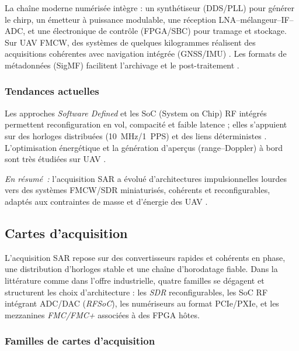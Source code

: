 La chaîne moderne numérisée intègre : un synthétiseur (DDS/PLL) pour générer le chirp, un émetteur à puissance modulable, une réception LNA--mélangeur--IF--ADC, et une électronique de contrôle (FPGA/SBC) pour tramage et stockage. Sur UAV FMCW, des systèmes de quelques kilogrammes réalisent des acquisitions cohérentes avec navigation intégrée (GNSS/IMU) \cite{Aguasca2013_ARBRES_UAV_SAR,Svedin2021_UAVSAR}. Les formats de métadonnées (SigMF) facilitent l’archivage et le post-traitement \cite{Balister2017_SigMF}.

\subsubsection{Tendances actuelles}

Les approches \textit{Software Defined} et les SoC (System on Chip) RF intégrés permettent reconfiguration en vol, compacité et faible latence ; elles s’appuient sur des horloges distribuées (10~MHz/1~PPS) et des liens déterministes \cite{AMD_RFSoC_DS889,ADI_JESD204B_Survival}. L’optimisation énergétique et la génération d’aperçus (range--Doppler) à bord sont très étudiées sur UAV \cite{Svedin2021_UAVSAR,Sun2020_PassiveUAVSAR}.

\vspace{0.5em}
\noindent\textit{En résumé~:} l’acquisition SAR a évolué d’architectures impulsionnelles lourdes vers des systèmes FMCW/SDR miniaturisés, cohérents et reconfigurables, adaptés aux contraintes de masse et d’énergie des UAV \cite{Aguasca2013_ARBRES_UAV_SAR,Svedin2021_UAVSAR}.

\subsection{Cartes d’acquisition}

L’acquisition SAR repose sur des convertisseurs rapides et cohérents en phase, une distribution d’horloges stable et une chaîne d’horodatage fiable. Dans la littérature comme dans l’offre industrielle, quatre familles se dégagent et structurent les choix d’architecture : les \textit{SDR }reconfigurables, les SoC RF intégrant ADC/DAC (\textit{RFSoC}), les numériseurs au format PCIe/PXIe, et les mezzanines \textit{FMC/FMC+} associées à des FPGA hôtes.

\subsubsection{Familles de cartes d’acquisition}

